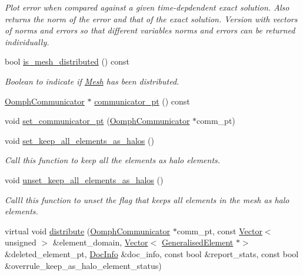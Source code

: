 \begin{DoxyCompactItemize}
\begin{DoxyCompactList}\small\item\em Plot error when compared against a given time-\/depdendent exact solution. Also returns the norm of the error and that of the exact solution. Version with vectors of norms and errors so that different variables\textquotesingle{} norms and errors can be returned individually. \end{DoxyCompactList}\item 
bool \hyperlink{classoomph_1_1Mesh_a1ab35b022b95f2d28c53aa58859bd6b5}{is\+\_\+mesh\+\_\+distributed} () const
\begin{DoxyCompactList}\small\item\em Boolean to indicate if \hyperlink{classoomph_1_1Mesh}{Mesh} has been distributed. \end{DoxyCompactList}\item 
\hyperlink{classoomph_1_1OomphCommunicator}{Oomph\+Communicator} $\ast$ \hyperlink{classoomph_1_1Mesh_a3b2c1aba0f9cb4e1767c65f9a3162577}{communicator\+\_\+pt} () const
\item 
void \hyperlink{classoomph_1_1Mesh_aa5684cde011ba20382e719e63a1329eb}{set\+\_\+communicator\+\_\+pt} (\hyperlink{classoomph_1_1OomphCommunicator}{Oomph\+Communicator} $\ast$comm\+\_\+pt)
\item 
void \hyperlink{classoomph_1_1Mesh_a21a502b283ad962d3999a9f347484f38}{set\+\_\+keep\+\_\+all\+\_\+elements\+\_\+as\+\_\+halos} ()
\begin{DoxyCompactList}\small\item\em Call this function to keep all the elements as halo elements. \end{DoxyCompactList}\item 
void \hyperlink{classoomph_1_1Mesh_ac0bf3e23f2a5ee4521df5541d047728f}{unset\+\_\+keep\+\_\+all\+\_\+elements\+\_\+as\+\_\+halos} ()
\begin{DoxyCompactList}\small\item\em Calll this function to unset the flag that keeps all elements in the mesh as halo elements. \end{DoxyCompactList}\item 
virtual void \hyperlink{classoomph_1_1Mesh_ad8a0c5d583e4f7bc1f498b5ab27afd94}{distribute} (\hyperlink{classoomph_1_1OomphCommunicator}{Oomph\+Communicator} $\ast$comm\+\_\+pt, const \hyperlink{classoomph_1_1Vector}{Vector}$<$ unsigned $>$ \&element\+\_\+domain, \hyperlink{classoomph_1_1Vector}{Vector}$<$ \hyperlink{classoomph_1_1GeneralisedElement}{Generalised\+Element} $\ast$$>$ \&deleted\+\_\+element\+\_\+pt, \hyperlink{classoomph_1_1DocInfo}{Doc\+Info} \&doc\+\_\+info, const bool \&report\+\_\+stats, const bool \&overrule\+\_\+keep\+\_\+as\+\_\+halo\+\_\+element\+\_\+status)
$$
\end{DoxyCompactItemize}
